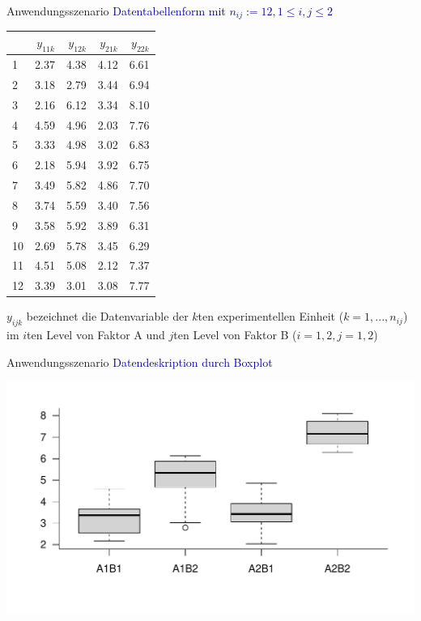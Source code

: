 \documentclass[
  8pt,
  ignorenonframetext,
]{beamer}
\begin{document}
\begin{frame}{Anwendungsszenario}
\protect\hypertarget{anwendungsszenario-3}{}
\textcolor{darkblue}{Datentabellenform mit $n_{ij} := 12, 1 \le i,j \le 2$}

\small
\center

\begin{longtable}[]{@{}lrrrr@{}}
\toprule
& \(y_{11k}\) & \(y_{12k}\) & \(y_{21k}\) & \(y_{22k}\) \\
\midrule
\endhead
1 & 2.37 & 4.38 & 4.12 & 6.61 \\
2 & 3.18 & 2.79 & 3.44 & 6.94 \\
3 & 2.16 & 6.12 & 3.34 & 8.10 \\
4 & 4.59 & 4.96 & 2.03 & 7.76 \\
5 & 3.33 & 4.98 & 3.02 & 6.83 \\
6 & 2.18 & 5.94 & 3.92 & 6.75 \\
7 & 3.49 & 5.82 & 4.86 & 7.70 \\
8 & 3.74 & 5.59 & 3.40 & 7.56 \\
9 & 3.58 & 5.92 & 3.89 & 6.31 \\
10 & 2.69 & 5.78 & 3.45 & 6.29 \\
11 & 4.51 & 5.08 & 2.12 & 7.37 \\
12 & 3.39 & 3.01 & 3.08 & 7.77 \\
\bottomrule
\end{longtable}

\vspace{-2mm}
\center
\small

\(y_{ijk}\) bezeichnet die Datenvariable der \(k\)ten experimentellen
Einheit (\(k = 1,...,n_{ij}\)) im \(i\)ten Level von Faktor A und
\(j\)ten Level von Faktor B (\(i = 1,2, j = 1,2\))
\end{frame}

\begin{frame}{Anwendungsszenario}
\protect\hypertarget{anwendungsszenario-4}{}
\textcolor{darkblue}{Datendeskription durch Boxplot}

\vspace{3mm}
\center

\begin{center}\includegraphics[width=0.95\linewidth]{11_Abbildungen/alm_11_zva_boxplot} \end{center}
\end{frame}
\end{document}
